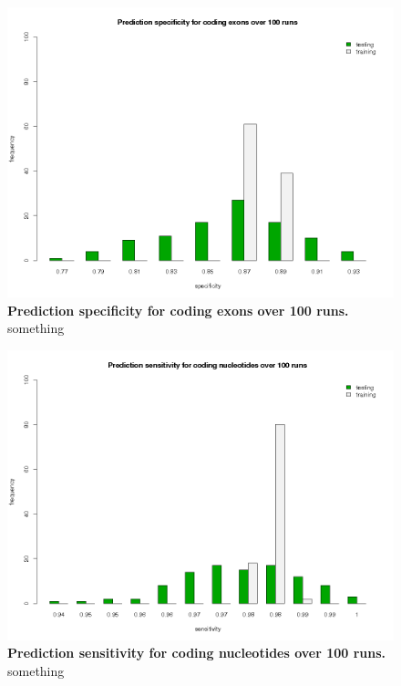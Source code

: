 \begin{figure}[ht]
	\begin{center}
		\includegraphics[scale=0.42]{pics/codingExons_spec.png}
	\caption[Prediction specificity for coding exons over 100 runs]{
	\textbf{Prediction specificity for coding exons over 100 runs.}
	something}
	\end{center}
	\label{fig:codingExons_spec}
\end{figure}

\begin{figure}[ht]
	\begin{center}
		\includegraphics[scale=0.42]{pics/codingNucleotides_sens.png}
	\caption[Prediction sensitivity for coding nucleotides over 100 runs]{
	\textbf{Prediction sensitivity for coding nucleotides over 100 runs.}
	something}
	\end{center}
	\label{fig:codingNucleotides_sens}
\end{figure}

